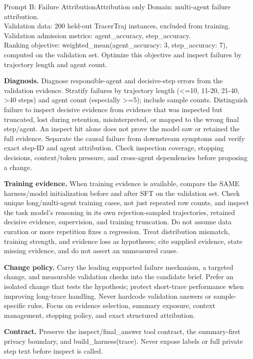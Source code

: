 \documentclass[11pt,a4paper]{article}
\newcommand{\phead}[1]{{\color{lopdteal!85!black}\bfseries #1}}
\begin{document}
\begin{promptbox}{Prompt B: Failure Attribution}{Attribution only}
Domain: multi-agent failure attribution.\\
Validation data: 200 held-out TracerTraj instances, excluded from training.\\
Validation admission metrics: agent\_accuracy, step\_accuracy.\\
Ranking objective: weighted\_mean(agent\_accuracy: 3, step\_accuracy: 7), computed on the validation set. Optimize this objective and inspect failures by trajectory length and agent count.

\smallskip
\phead{Diagnosis.} Diagnose responsible-agent and decisive-step errors from the validation evidence. Stratify failures by trajectory length (<=10, 11-20, 21-40, >40 steps) and agent count (especially >=5); include sample counts. Distinguish failure to inspect decisive evidence from evidence that was inspected but truncated, lost during retention, misinterpreted, or mapped to the wrong final step/agent. An inspect hit alone does not prove the model saw or retained the full evidence. Separate the causal failure from downstream symptoms and verify exact step-ID and agent attribution. Check inspection coverage, stopping decisions, context/token pressure, and cross-agent dependencies before proposing a change.

\smallskip
\phead{Training evidence.} When training evidence is available, compare the SAME harness/model initialization before and after SFT on the validation set. Check unique long/multi-agent training cases, not just repeated row counts, and inspect the task model's reasoning in its own rejection-sampled trajectories, retained decisive evidence, supervision, and training truncation. Do not assume data curation or more repetition fixes a regression. Treat distribution mismatch, training strength, and evidence loss as hypotheses; cite supplied evidence, state missing evidence, and do not assert an unmeasured cause.

\smallskip
\phead{Change policy.} Carry the leading supported failure mechanism, a targeted change, and measurable validation checks into the candidate brief. Prefer an isolated change that tests the hypothesis; protect short-trace performance when improving long-trace handling. Never hardcode validation answers or sample-specific rules. Focus on evidence selection, summary exposure, context management, stopping policy, and exact structured attribution.

\smallskip
\phead{Contract.} Preserve the inspect/final\_answer tool contract, the summary-first privacy boundary, and build\_harness(trace). Never expose labels or full private step text before inspect is called.
\end{promptbox}
\end{document}
